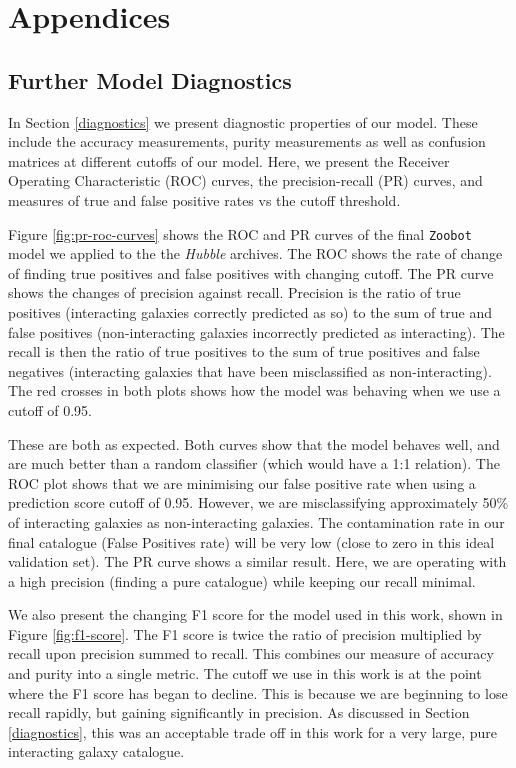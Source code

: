 \chapter{Appendices}

\section{Further Model Diagnostics}\label{further-diagnostics}
\noindent In Section \ref{diagnostics} we present diagnostic properties of our model. These include the accuracy measurements, purity measurements as well as confusion matrices at different cutoffs of our model. Here, we present the Receiver Operating Characteristic (ROC) curves, the precision-recall (PR) curves, and measures of true and false positive rates vs the cutoff threshold.

Figure \ref{fig:pr-roc-curves} shows the ROC and PR curves of the final \texttt{Zoobot} model we applied to the the \emph{Hubble} archives. The ROC shows the rate of change of finding true positives and false positives with changing cutoff. The PR curve shows the changes of precision against recall. Precision is the ratio of true positives (interacting galaxies correctly predicted as so) to the sum of true and false positives (non-interacting galaxies incorrectly predicted as interacting). The recall is then the ratio of true positives to the sum of true positives and false negatives (interacting galaxies that have been misclassified as non-interacting). The red crosses in both plots shows how the model was behaving when we use a cutoff of 0.95. 

These are both as expected. Both curves show that the model behaves well, and are much better than a random classifier (which would have a 1:1 relation). The ROC plot shows that we are minimising our false positive rate when using a prediction score cutoff of 0.95. However, we are misclassifying approximately 50\% of interacting galaxies as non-interacting galaxies. The contamination rate in our final catalogue (False Positives rate) will be very low (close to zero in this ideal validation set). The PR curve shows a similar result. Here, we are operating with a high precision (finding a pure catalogue) while keeping our recall minimal. 

We also present the changing F1 score for the model used in this work, shown in Figure \ref{fig:f1-score}. The F1 score is twice the ratio of precision multiplied by recall upon precision summed to recall. This combines our measure of accuracy and purity into a single metric. The cutoff we use in this work is at the point where the F1 score has began to decline. This is because we are beginning to lose recall rapidly, but gaining significantly in precision. As discussed in Section \ref{diagnostics}, this was an acceptable trade off in this work for a very large, pure interacting galaxy catalogue.

